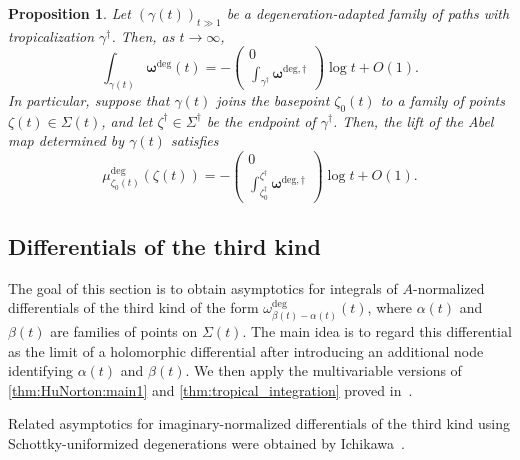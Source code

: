 \documentclass[12pt]{amsart}
\numberwithin{equation}{section}
\newtheorem{proposition}[theorem]{Proposition}
\theoremstyle{definition}
\def\trop{\dagger}
\def\ptSig{\zeta}
\def\basept{{\ptSig_0}}
\def\baseptT{{\ptSig_0^\trop}}
\def\mcurve{\Sigma}
\def\tropmcurve{\mcurve^\trop}
\begin{document}
\begin{proposition}
\label{cor:abelmap}
Let $(\gamma(t))_{t\gg1}$ be a degeneration-adapted family of paths
with tropicalization $\gamma^\trop$. Then, as $t\to\infty$,
\[
\int_{\gamma(t)}
\bm\omega^{\mathrm{deg}}(t)
=
-
\begin{pmatrix}
0\\
\displaystyle
\int_{\gamma^\trop}
\bm\omega^{\mathrm{deg},\trop}
\end{pmatrix}
\log t
+
O(1).
\]
In particular, suppose that $\gamma(t)$ joins the basepoint
$\basept(t)$ to a family of points $\ptSig(t)\in\mcurve(t)$, and let
$\ptSig^\trop\in\tropmcurve$ be the endpoint of $\gamma^\trop$.
Then, the lift of the Abel map determined by $\gamma(t)$ satisfies
\[
\mu_{\basept(t)}^{\mathrm{deg}}(\ptSig(t))
=
-
\begin{pmatrix}
0\\
\displaystyle
\int_{\baseptT}^{\ptSig^\trop}
\bm\omega^{\mathrm{deg},\trop}
\end{pmatrix}
\log t
+
O(1).
\]
\end{proposition}

\subsection{Differentials of the third kind}
\label{sec:third_kind_asymptotics}

The goal of this section is to obtain asymptotics for integrals of
$A$-normalized differentials of the third kind of the form
$\omega_{\beta(t)-\alpha(t)}^{\mathrm{deg}}(t)$, where $\alpha(t)$ and
$\beta(t)$ are families of points on $\mcurve(t)$. The main idea is to
regard this differential as the limit of a holomorphic differential
after introducing an additional node identifying $\alpha(t)$ and
$\beta(t)$. We then apply the multivariable versions of
\cref{thm:HuNorton:main1} and \cref{thm:tropical_integration} proved
in~\cite{HuNorton}.

Related asymptotics for imaginary-normalized differentials of the third kind using Schottky-uniformized degenerations were obtained by Ichikawa~\cite[Theorem~4.7]{IchikawaHarmonicAmoebas}.
\end{document}
